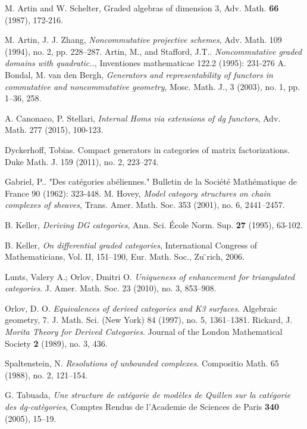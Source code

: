 \documentclass[reqno, 12pt]{amsart}
\begin{document}
\begin{thebibliography}{99}
 M. Artin and W. Schelter, Graded algebras of dimension 3, Adv. Math. \textbf{66} (1987), 172-216.
  
  M. Artin, J. J. Zhang, \emph{Noncommutative projective schemes}, Adv. Math. 109 (1994), no. 2, pp. 228--287.
  Artin, M., and Stafford, J.T.. \emph{Noncommutative graded domains with quadratic..}, Inventiones mathematicae 122.2 (1995): 231-276
  A. Bondal, M. van den Bergh, \emph{Generators and representability of functors in commutative and noncommutative geometry}, Mosc. Math. J., 3 (2003), no. 1, pp. 1--36, 258.
  
  A. Canonaco, P. Stellari, \emph{Internal Homs via extensions of dg functors}, Adv. Math. 277 (2015), 100-123.

  Dyckerhoff, Tobias. Compact generators in categories of matrix factorizations. Duke Math. J. 159 (2011), no. 2, 223--274.

  Gabriel, P.. "Des catégories abéliennes." Bulletin de la Société Mathématique de France 90 (1962): 323-448.
  M. Hovey, \emph{Model category structures on chain complexes of sheaves}, Trans. Amer. Math. Soc. 353 (2001), no. 6, 2441--2457.

  B. Keller, \emph{Deriving DG categories}, Ann. Sci. \'{E}cole Norm. Sup. \textbf{27} (1995), 63-102.

  B. Keller, \emph{On differential graded categories}, International Congress of Mathematicians, Vol. II, 151–190, Eur. Math. Soc., Zu ̈rich, 2006.
  
  Lunts, Valery A.; Orlov, Dmitri O. {\em Uniqueness of enhancement for triangulated categories}. J. Amer. Math. Soc. 23 (2010), no. 3, 853--908.

  Orlov, D. O. {\em Equivalences of derived categories and K3 surfaces}. Algebraic geometry, 7. J.
  Math. Sci. (New York) 84 (1997), no. 5, 1361–1381.
  Rickard, J. {\em Morita Theory for Derived Categories}. Journal of the London Mathematical Society \textbf{2} (1989), no. 3, 436.

  Spaltenstein, N. {\em Resolutions of unbounded complexes}. Compositio Math. 65 (1988), no. 2, 121--154.

  G. Tabuada, \emph{Une structure de cat\'{e}gorie de mod\`{e}les de Quillen sur la cat\'{e}gorie des dg-cat\`{e}gories}, Comptes Rendus de l'Academie de Sciences de Paris \textbf{340} (2005), 15--19.
  

\end{thebibliography}
\end{document}
